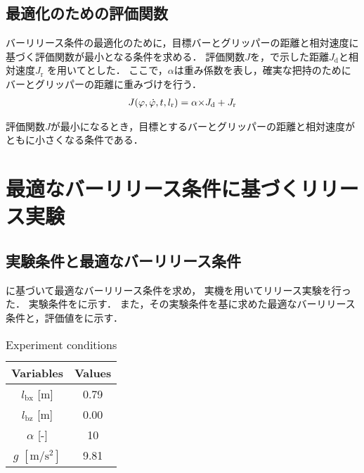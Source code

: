         \subsection{最適化のための評価関数}
        
        バーリリース条件の最適化のために，目標バーとグリッパーの距離と相対速度に基づく評価関数が最小となる条件を求める．
        評価関数$J$を，で示した距離$J_{\mathrm{d}}$と相対速度$J_{\mathrm{r}}$
        を用いてとした．
        ここで，$\alpha$は重み係数を表し，確実な把持のためにバーとグリッパーの距離に重みづけを行う．
        \begin{eqnarray}
          \equlabel{J}
          J(\varphi,\dot{\varphi},t,l_{\mathrm{r}})=\alpha{\times}J_{\mathrm{d}}+J_{\mathrm{r}}
        \end{eqnarray}
        
        評価関数$J$が最小になるとき，目標とするバーとグリッパーの距離と相対速度がともに小さくなる条件である．


      \section{最適なバーリリース条件に基づくリリース実験}
        \subsection{実験条件と最適なバーリリース条件}
        に基づいて最適なバーリリース条件を求め，
        実機を用いてリリース実験を行った．
        実験条件をに示す．
        また，その実験条件を基に求めた最適なバーリリース条件と，評価値をに示す．
        \begin{table}[tb]
          \begin{center}
            \caption{Experiment conditions}
            \vspace{2mm}
            \begin{tabular}{c|c}
              \hline
              Variables & Values \\
              \hline
              $l_{\mathrm{bx}}$ [m] & 0.79 \\
              $l_{\mathrm{bz}}$ [m] & 0.00 \\
              $\alpha$ [-]& 10 \\
              $g$ $\mathrm{[m/s^2]}$ & 9.81 \\
              \hline
            \end{tabular}
          \end{center}
        \end{table}

